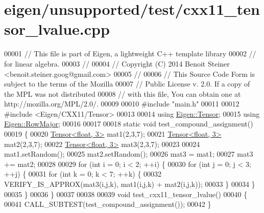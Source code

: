 \hypertarget{eigen_2unsupported_2test_2cxx11__tensor__lvalue_8cpp_source}{}\section{eigen/unsupported/test/cxx11\+\_\+tensor\+\_\+lvalue.cpp}
\label{eigen_2unsupported_2test_2cxx11__tensor__lvalue_8cpp_source}

\begin{DoxyCode}
00001 \textcolor{comment}{// This file is part of Eigen, a lightweight C++ template library}
00002 \textcolor{comment}{// for linear algebra.}
00003 \textcolor{comment}{//}
00004 \textcolor{comment}{// Copyright (C) 2014 Benoit Steiner <benoit.steiner.goog@gmail.com>}
00005 \textcolor{comment}{//}
00006 \textcolor{comment}{// This Source Code Form is subject to the terms of the Mozilla}
00007 \textcolor{comment}{// Public License v. 2.0. If a copy of the MPL was not distributed}
00008 \textcolor{comment}{// with this file, You can obtain one at http://mozilla.org/MPL/2.0/.}
00009 
00010 \textcolor{preprocessor}{#include "main.h"}
00011 
00012 \textcolor{preprocessor}{#include <Eigen/CXX11/Tensor>}
00013 
00014 \textcolor{keyword}{using} \hyperlink{class_eigen_1_1_tensor}{Eigen::Tensor};
00015 \textcolor{keyword}{using} \hyperlink{group__enums_ggaacded1a18ae58b0f554751f6cdf9eb13acfcde9cd8677c5f7caf6bd603666aae3}{Eigen::RowMajor};
00016 
00017 
00018 \textcolor{keyword}{static} \textcolor{keywordtype}{void} test\_compound\_assignment()
00019 \{
00020   \hyperlink{class_eigen_1_1_tensor}{Tensor<float, 3>} mat1(2,3,7);
00021   \hyperlink{class_eigen_1_1_tensor}{Tensor<float, 3>} mat2(2,3,7);
00022   \hyperlink{class_eigen_1_1_tensor}{Tensor<float, 3>} mat3(2,3,7);
00023 
00024   mat1.setRandom();
00025   mat2.setRandom();
00026   mat3 = mat1;
00027   mat3 += mat2;
00028 
00029   \textcolor{keywordflow}{for} (\textcolor{keywordtype}{int} i = 0; i < 2; ++i) \{
00030     \textcolor{keywordflow}{for} (\textcolor{keywordtype}{int} j = 0; j < 3; ++j) \{
00031       \textcolor{keywordflow}{for} (\textcolor{keywordtype}{int} k = 0; k < 7; ++k) \{
00032         VERIFY\_IS\_APPROX(mat3(i,j,k), mat1(i,j,k) + mat2(i,j,k));
00033       \}
00034     \}
00035   \}
00036 \}
00037 
00038 
00039 \textcolor{keywordtype}{void} test\_cxx11\_tensor\_lvalue()
00040 \{
00041   CALL\_SUBTEST(test\_compound\_assignment());
00042 \}
\end{DoxyCode}
